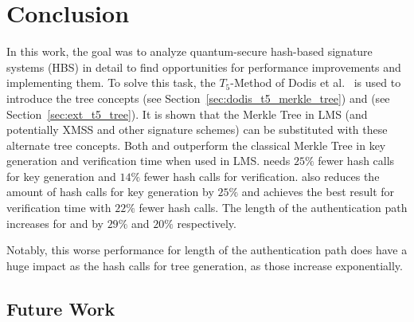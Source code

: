 \chapter{Conclusion}
\label{cha:conclusion}

In this work, the goal was to analyze quantum-secure hash-based signature systems (HBS) in detail to find opportunities for performance improvements and implementing them. 
To solve this task, the $T_5$-Method of Dodis et al.~\cite{T5_paper} is used to introduce the tree concepts \tftree (see Section~\ref{sec:dodis_t5_merkle_tree}) and \extree (see Section~\ref{sec:ext_t5_tree}). 
It is shown that the Merkle Tree in LMS (and potentially XMSS and other signature schemes) can be substituted with these alternate tree concepts.
Both \tftree and \extree outperform the classical Merkle Tree in key generation and verification time when used in LMS. \tftree needs $25\%$ fewer hash calls for key generation and $14\%$ fewer hash calls for verification. \extree also reduces the amount of hash calls for key generation by $25\%$ and achieves the best result for verification time with $22\%$ fewer hash calls.
The length of the authentication path increases for \tftree and \extree by $29\%$ and $20\%$ respectively. 

Notably, this worse performance for length of the authentication path does have a huge impact as the hash calls for tree generation, as those increase exponentially.





\section{Future Work}





